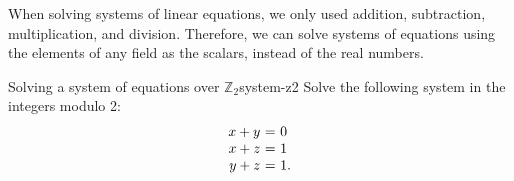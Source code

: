 When solving systems of linear equations, we only used addition,
subtraction, multiplication, and division. Therefore, we can solve
systems of equations using the elements of any field as the scalars,
instead of the real numbers.

\begin{example}{Solving a system of equations over $\mathbb{Z}_2$}{system-z2}
  Solve the following system in the integers modulo 2:
  \begin{equation*}
    \begin{array}{r@{~}c@{~}l}
      x + y     &=& 0 \\
      x     + z &=& 1 \\
          y + z &=& 1.
    \end{array}
  \end{equation*}
\end{example}

